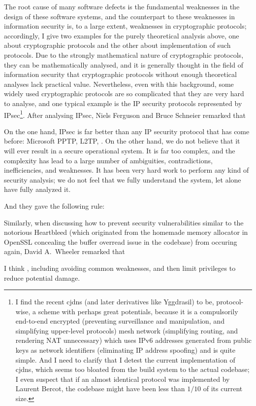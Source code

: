 The root cause of many software defects is the fundamental weaknesses in the
design of these software systems, and the counterpart to these weaknesses in
information security is, to a large extent, weaknesses in cryptographic
protocols; accordingly, I give two examples for the purely theoretical analysis
above, one about cryptographic protocols and the other about implementation of
such protocols.  Due to the strongly mathematical nature of cryptographic
protocols, they can be mathematically analysed, and it is generally thought
in the field of information security that cryptographic protocols without
enough theoretical analyses lack practical value.
Nevertheless, even with this background, some widely used cryptographic
protocols are so complicated that they are very hard to analyse, and one typical
example is the IP security protocols represented by IPsec\footnote{I find the
recent cjdns (and later derivatives like Yggdrasil) to be, protocol-wise, a
scheme with perhaps great potentials, because it is a compulsorily end-to-end
encrypted (preventing surveillance and manipulation, and simplifying upper-level
protocols) mesh network (simplifying routing, and rendering NAT unnecessary)
which uses IPv6 addresses generated from public keys as network identifiers
(eliminating IP address spoofing) and is quite simple.  And I need to clarify
that I detest the current implementation of cjdns, which seems too bloated
from the build system to the actual codebase; I even suspect that if an almost
identical protocol was implemented by Laurent Bercot, the codebase might
have been less than $1/10$ of its current size.}.  After analysing IPsec,
Niels Ferguson and Bruce Schneier remarked that
\begin{quoting}
	On the one hand, IPsec is far better than any IP security protocol that has
	come before: Microsoft PPTP, L2TP, \etc.  On the other hand, we do not
	believe that it will ever result in a secure operational system.  It is far
	too complex, and the complexity has lead to a large number of ambiguities,
	contradictions, inefficiencies, and weaknesses.  It has been very hard work
	to perform any kind of security analysis; we do not feel that we fully
	understand the system, let alone have fully analyzed it.
\end{quoting}
And they gave the following rule:
\begin{quoting}
\end{quoting}
Similarly, when discussing how to prevent security vulnerabilities similar
to the notorious Heartbleed (which originated from the homemade memory
allocator in OpenSSL concealing the buffer overread issue in the codebase)
from occuring again, David A.\ Wheeler remarked that
\begin{quoting}
	I think , including avoiding
	common weaknesses, and then limit privileges to reduce potential damage.
\end{quoting}

